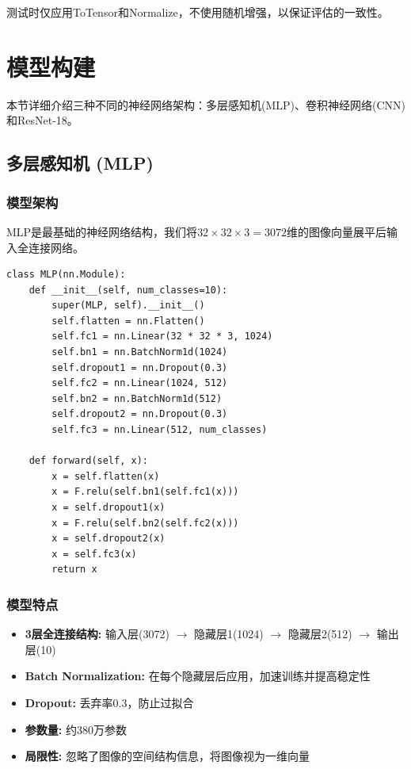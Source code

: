 \documentclass[12pt,a4paper]{article}
\begin{document}
测试时仅应用ToTensor和Normalize，不使用随机增强，以保证评估的一致性。

\section{模型构建}

本节详细介绍三种不同的神经网络架构：多层感知机(MLP)、卷积神经网络(CNN)和ResNet-18。

\subsection{多层感知机 (MLP)}

\subsubsection{模型架构}

MLP是最基础的神经网络结构，我们将$32 \times 32 \times 3 = 3072$维的图像向量展平后输入全连接网络。

\begin{lstlisting}[caption={MLP模型定义},label={lst:mlp}]
class MLP(nn.Module):
    def __init__(self, num_classes=10):
        super(MLP, self).__init__()
        self.flatten = nn.Flatten()
        self.fc1 = nn.Linear(32 * 32 * 3, 1024)
        self.bn1 = nn.BatchNorm1d(1024)
        self.dropout1 = nn.Dropout(0.3)
        self.fc2 = nn.Linear(1024, 512)
        self.bn2 = nn.BatchNorm1d(512)
        self.dropout2 = nn.Dropout(0.3)
        self.fc3 = nn.Linear(512, num_classes)
        
    def forward(self, x):
        x = self.flatten(x)
        x = F.relu(self.bn1(self.fc1(x)))
        x = self.dropout1(x)
        x = F.relu(self.bn2(self.fc2(x)))
        x = self.dropout2(x)
        x = self.fc3(x)
        return x
\end{lstlisting}

\subsubsection{模型特点}

\begin{itemize}[leftmargin=2em]
    \item \textbf{3层全连接结构:} 输入层(3072) $\rightarrow$ 隐藏层1(1024) $\rightarrow$ 隐藏层2(512) $\rightarrow$ 输出层(10)
    \item \textbf{Batch Normalization:} 在每个隐藏层后应用，加速训练并提高稳定性
    \item \textbf{Dropout:} 丢弃率0.3，防止过拟合
    \item \textbf{参数量:} 约380万参数
    \item \textbf{局限性:} 忽略了图像的空间结构信息，将图像视为一维向量
\end{itemize}
\end{document}
